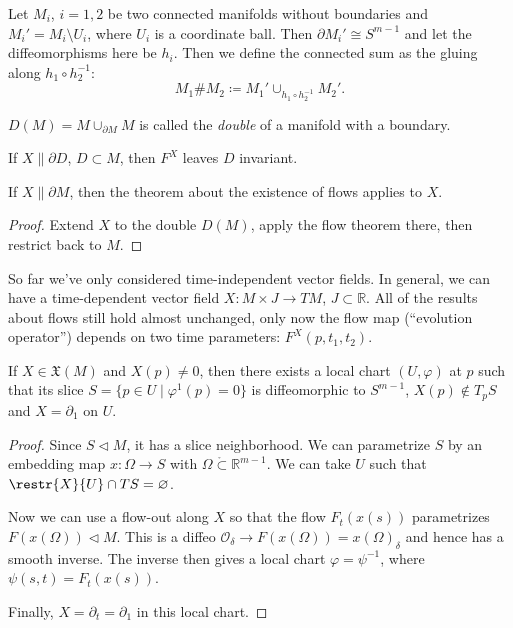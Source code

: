 \documentclass[english,letterpaper]{article}%
\numberwithin{equation}{section}
\numberwithin{figure}{section}
\numberwithin{table}{section}
\theoremstyle{definition}
\theoremstyle{definition}
\theoremstyle{definition}
\theoremstyle{plain}
\theoremstyle{plain}
\theoremstyle{plain}
\theoremstyle{plain}
\theoremstyle{remark}
\theoremstyle{remark}
\newcommand{\fX}{\mathfrak{X}}
\newcommand{\sub}{\vartriangleleft}
\begin{document}
\begin{defn}
Let $M_i$, $i=1,2$ be two connected manifolds without boundaries and $M_i'=M_i\setminus U_i$, where $U_i$ is a coordinate ball. Then $\partial M_i'\cong S^{m-1}$ and let the diffeomorphisms here be $h_i$. Then we define the connected sum as the gluing along $h_1\circ h_2^{-1}$:
\[M_1 \# M_2\coloneqq M_1'\cup_{h_1\circ h_2^{-1}}M_2'.\]
\end{defn}
\begin{example}
$D(M)=M\cup_{\partial M}M$ is called the \emph{double} of a manifold with a boundary.
\end{example}
\begin{example}
If $X\parallel \partial D$, $D\subset M$, then $F^X$ leaves $D$ invariant.
\end{example}
\begin{cor}
If $X\parallel \partial M$, then the theorem about the existence of flows applies to $X$.
\end{cor}
\begin{proof}
Extend $X$ to the double $D(M)$, apply the flow theorem there, then restrict back to $M$.
\end{proof}
\begin{example}
So far we've only considered time-independent vector fields. In general, we can have a time-dependent vector field $X:M\times J\to TM$, $J\subset\mathbb{R}$. All of the results about flows still hold almost unchanged, only now the flow map (``evolution operator'') depends on two time parameters: $F^X(p,t_1,t_2)$.
\end{example}

\begin{thm}\label{rectification}
If $X\in\fX(M)$ and $X(p)\neq 0$, then there exists a local chart $(U,\varphi)$ at $p$ such that its slice $S=\{p\in U\mid \varphi^1(p)=0\}$ is diffeomorphic to $S^{m-1}$, $X(p)\notin T_p S$ and $X=\partial_1$ on $U$.
\end{thm}
\begin{proof}
Since $S\sub M$, it has a slice neighborhood. We can parametrize $S$ by an embedding map $x:\Omega\to S$ with $\Omega\mathring{\subset}\mathbb{R}^{m-1}$. We can take $U$ such that $\restr{X}{U}\cap TS=\varnothing$. 

Now we can use a flow-out along $X$ so that the flow $F_t(x(s))$ parametrizes $F(x(\Omega))\sub M$. This is a diffeo $\mathcal{O}_\delta\to F(x(\Omega))=x(\Omega)_\delta$ and hence has a smooth inverse. The inverse then gives a local chart $\varphi=\psi^{-1}$, where $\psi(s,t)=F_t(x(s))$.

Finally, $X=\partial_t=\partial_1$ in this local chart.
\end{proof}
\end{document}
